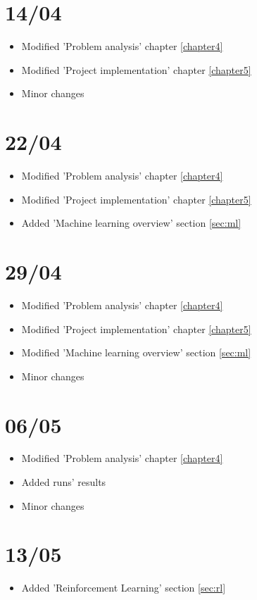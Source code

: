 \section{14/04}
\begin{itemize}
    \item Modified 'Problem analysis' chapter \ref{chapter4}
    \item Modified 'Project implementation' chapter \ref{chapter5}
    \item Minor changes
\end{itemize}

\section{22/04}
\begin{itemize}
    \item Modified 'Problem analysis' chapter \ref{chapter4}
    \item Modified 'Project implementation' chapter \ref{chapter5}
    \item Added 'Machine learning overview' section \ref{sec:ml}
\end{itemize}

\section{29/04}
\begin{itemize}
    \item Modified 'Problem analysis' chapter \ref{chapter4}
    \item Modified 'Project implementation' chapter \ref{chapter5}
    \item Modified 'Machine learning overview' section \ref{sec:ml}
    \item Minor changes
\end{itemize}

\section{06/05}
\begin{itemize}
    \item Modified 'Problem analysis' chapter \ref{chapter4}
    \item Added runs' results
    \item Minor changes
\end{itemize}

\section{13/05}
\begin{itemize}
    \item Added 'Reinforcement Learning' section \ref{sec:rl}
\end{itemize}

